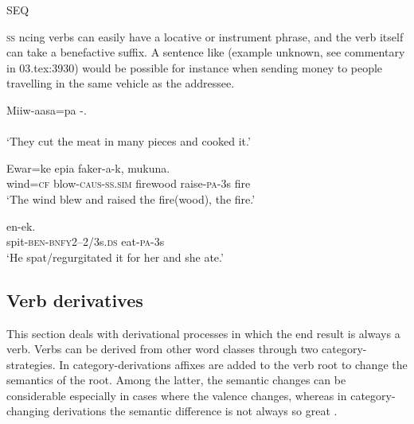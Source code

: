 SEQ 
 
\textsc{ss}
 ncing verbs can easily have a locative or instrument phrase, and the verb itself can take a benefactive suffix. A sentence like (example unknown, see commentary in 03.tex:3930) 
 would be possible for instance when sending money to people travelling in the same vehicle as the addressee. 

\ea%
\label{ex:3:x409} %
\gll Miiw-aasa=pa -. \\ \\
\glt`They cut the meat in many pieces and cooked it.'
\z

\ea%
\label{ex:3:x186}
\gll Ewar=ke  epia faker-a-k, mukuna. \\
wind=\textsc{cf} blow-\textsc{caus}-\textsc{ss}.\textsc{sim} firewood raise-\textsc{pa}-3s fire \\
\glt`The wind blew and raised the fire(wood), the fire.' 
\z

\ea%
\label{ex:3:x187}
\gll {} en-ek. \\
spit-\textsc{ben}-\textsc{bnfy}2--2/3s.\textsc{ds} eat-\textsc{pa}-3s \\
\glt`He spat/regurgitated it for her and she ate.'
\z

\subsection{Verb derivatives}\label{sec:3.8.2}
{}
This section deals with derivational processes in which the end result is always a verb. Verbs can be derived from other word classes through two category- strategies. In category-derivations affixes are added to the verb root to change the semantics of the root. Among the latter, the semantic changes can be considerable especially in cases where the valence changes, whereas in category-changing derivations the semantic difference is not always so great \citep[83]{Bybee1985}. 

